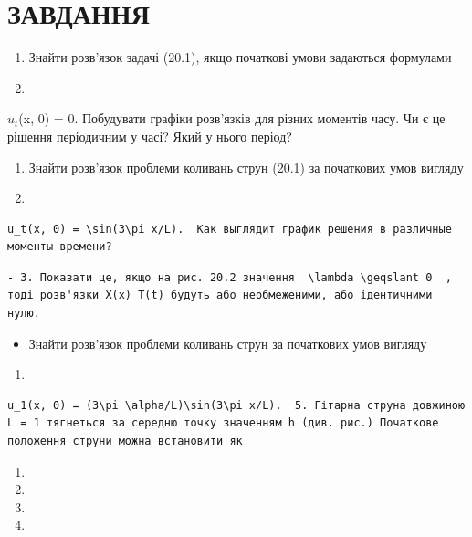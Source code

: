 \documentclass[
  ukrainian,
]{article}
\providecommand{\tightlist}{%
  \setlength{\itemsep}{0pt}\setlength{\parskip}{0pt}}
\begin{document}
\section{ЗАВДАННЯ}\label{ux437ux430ux432ux434ux430ux43dux43dux44f}

\begin{enumerate}
\def\labelenumi{\arabic{enumi}.}
\item
  Знайти розв'язок задачі (20.1), якщо початкові умови задаються
  формулами
\item
\end{enumerate}

\(u_t\)(x, 0) = 0. Побудувати графіки розв'язків для різних моментів
часу. Чи є це рішення періодичним у часі? Який у нього період?

\begin{enumerate}
\def\labelenumi{\arabic{enumi}.}
\setcounter{enumi}{1}
\item
  Знайти розв'язок проблеми коливань струн (20.1) за початкових умов
  вигляду
\item
\end{enumerate}

\begin{verbatim}
u_t(x, 0) = \sin(3\pi x/L).  Как выглядит график решения в различные моменты времени?
\end{verbatim}

\begin{verbatim}
- 3. Показати це, якщо на рис. 20.2 значення  \lambda \geqslant 0  , тоді розв'язки X(x) T(t) будуть або необмеженими, або ідентичними нулю.
\end{verbatim}

\begin{itemize}
\tightlist
\item
  Знайти розв'язок проблеми коливань струн за початкових умов вигляду
\end{itemize}

\begin{enumerate}
\def\labelenumi{\arabic{enumi}.}
\setcounter{enumi}{11}
\tightlist
\item
\end{enumerate}

\begin{verbatim}
u_1(x, 0) = (3\pi \alpha/L)\sin(3\pi x/L).  5. Гітарна струна довжиною L = 1 тягнеться за середню точку значенням h (див. рис.) Початкове положення струни можна встановити як
\end{verbatim}

\begin{enumerate}
\def\labelenumi{\arabic{enumi}.}
\setcounter{enumi}{12}
\tightlist
\item
\item
\item
\item
\end{enumerate}
\end{document}
